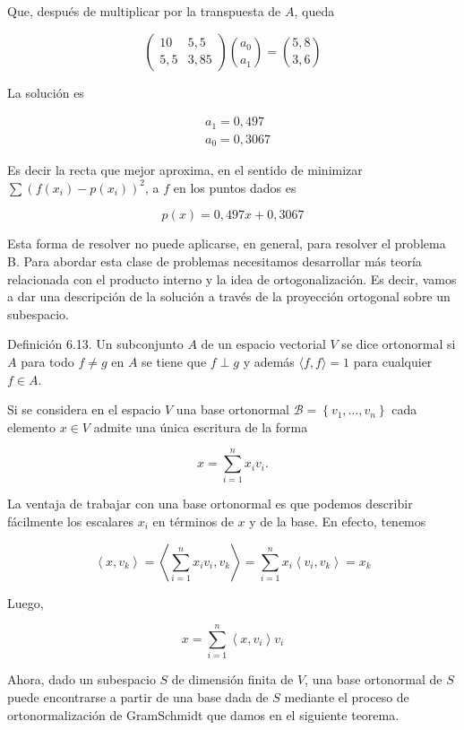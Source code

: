 \documentclass[10pt]{article}
\begin{document}
Que, después de multiplicar por la transpuesta de $A$, queda

$$
\left(\begin{array}{cc}
10 & 5,5 \\
5,5 & 3,85
\end{array}\right)\binom{a_{0}}{a_{1}}=\binom{5,8}{3,6}
$$

La solución es

$$
\begin{aligned}
& a_{1}=0,497 \\
& a_{0}=0,3067
\end{aligned}
$$

Es decir la recta que mejor aproxima, en el sentido de minimizar $\sum\left(f\left(x_{i}\right)-p\left(x_{i}\right)\right)^{2}$, a $f$ en los puntos dados es

$$
p(x)=0,497 x+0,3067
$$

Esta forma de resolver no puede aplicarse, en general, para resolver el problema B. Para abordar esta clase de problemas necesitamos desarrollar más teoría relacionada con el producto interno y la idea de ortogonalización. Es decir, vamos a dar una descripción de la solución a través de la proyección ortogonal sobre un subespacio.

Definición 6.13. Un subconjunto $A$ de un espacio vectorial $V$ se dice ortonormal si $A$ para todo $f \neq g$ en $A$ se tiene que $f \perp g$ y además $\langle f, f\rangle=1$ para cualquier $f \in A$.

Si se considera en el espacio $V$ una base ortonormal $\mathcal{B}=\left\{v_{1}, \ldots, v_{n}\right\}$ cada elemento $x \in V$ admite una única escritura de la forma

$$
x=\sum_{i=1}^{n} x_{i} v_{i} .
$$

La ventaja de trabajar con una base ortonormal es que podemos describir fácilmente los escalares $x_{i}$ en términos de $x$ y de la base. En efecto, tenemos

$$
\left\langle x, v_{k}\right\rangle=\left\langle\sum_{i=1}^{n} x_{i} v_{i}, v_{k}\right\rangle=\sum_{i=1}^{n} x_{i}\left\langle v_{i}, v_{k}\right\rangle=x_{k}
$$

Luego,

$$
x=\sum_{i=1}^{n}\left\langle x, v_{i}\right\rangle v_{i}
$$

Ahora, dado un subespacio $S$ de dimensión finita de $V$, una base ortonormal de $S$ puede encontrarse a partir de una base dada de $S$ mediante el proceso de ortonormalización de GramSchmidt que damos en el siguiente teorema.
\end{document}
